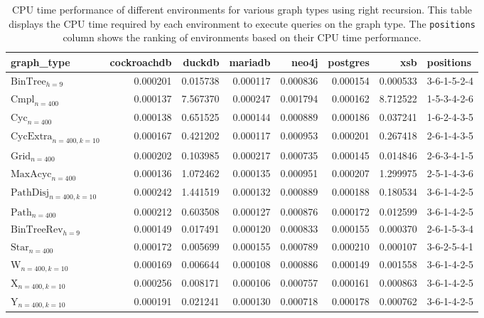 \begin{table}
\caption{CPU time performance of different environments for various graph types using right recursion. This table displays the CPU time required by each environment to execute queries on the graph type. The \texttt{positions} column shows the ranking of environments based on their CPU time performance.}
\label{table:results}
\begin{tabular}{lrrrrrrl}
\toprule
graph\_type & cockroachdb & duckdb & mariadb & neo4j & postgres & xsb & positions \\
\midrule
$\text{BinTree}_{h=9}$ & 0.000201 & 0.015738 & 0.000117 & 0.000836 & 0.000154 & 0.000533 & 3-6-1-5-2-4 \\
$\text{Cmpl}_{n=400}$ & 0.000137 & 7.567370 & 0.000247 & 0.001794 & 0.000162 & 8.712522 & 1-5-3-4-2-6 \\
$\text{Cyc}_{n=400}$ & 0.000138 & 0.651525 & 0.000144 & 0.000889 & 0.000186 & 0.037241 & 1-6-2-4-3-5 \\
$\text{CycExtra}_{n=400,k=10}$ & 0.000167 & 0.421202 & 0.000117 & 0.000953 & 0.000201 & 0.267418 & 2-6-1-4-3-5 \\
$\text{Grid}_{n=400}$ & 0.000202 & 0.103985 & 0.000217 & 0.000735 & 0.000145 & 0.014846 & 2-6-3-4-1-5 \\
$\text{MaxAcyc}_{n=400}$ & 0.000136 & 1.072462 & 0.000135 & 0.000951 & 0.000207 & 1.299975 & 2-5-1-4-3-6 \\
$\text{PathDisj}_{n=400,k=10}$ & 0.000242 & 1.441519 & 0.000132 & 0.000889 & 0.000188 & 0.180534 & 3-6-1-4-2-5 \\
$\text{Path}_{n=400}$ & 0.000212 & 0.603508 & 0.000127 & 0.000876 & 0.000172 & 0.012599 & 3-6-1-4-2-5 \\
$\text{BinTreeRev}_{h=9}$ & 0.000149 & 0.017491 & 0.000120 & 0.000833 & 0.000155 & 0.000370 & 2-6-1-5-3-4 \\
$\text{Star}_{n=400}$ & 0.000172 & 0.005699 & 0.000155 & 0.000789 & 0.000210 & 0.000107 & 3-6-2-5-4-1 \\
$\text{W}_{n=400,k=10}$ & 0.000169 & 0.006644 & 0.000108 & 0.000886 & 0.000149 & 0.001558 & 3-6-1-4-2-5 \\
$\text{X}_{n=400, k=10}$ & 0.000256 & 0.008171 & 0.000106 & 0.000757 & 0.000161 & 0.000863 & 3-6-1-4-2-5 \\
$\text{Y}_{n=400,k=10}$ & 0.000191 & 0.021241 & 0.000130 & 0.000718 & 0.000178 & 0.000762 & 3-6-1-4-2-5 \\
\bottomrule
\end{tabular}
\end{table}

